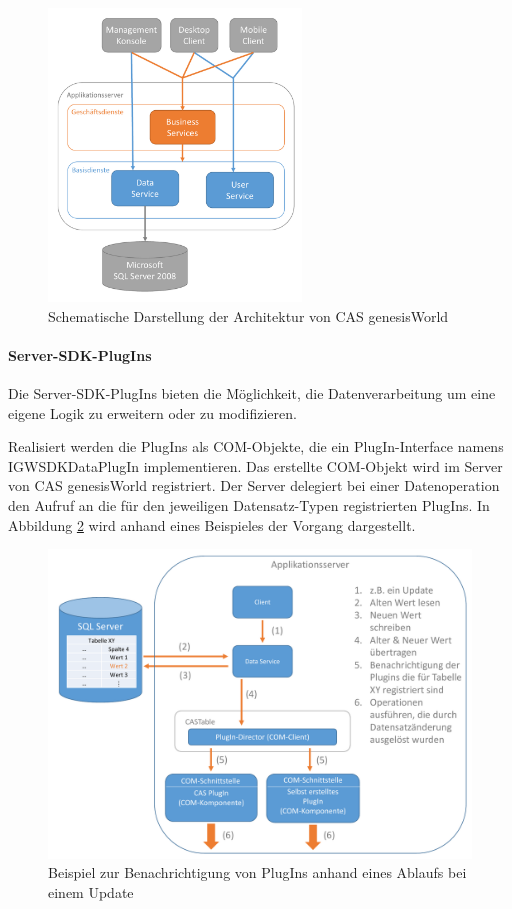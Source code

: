 \begin{figure}[H]
	\centering
  \includegraphics[width=0.6\textwidth, width=0.6\textwidth]{pics/GenesisWorld_Architektur.pdf}
	\caption{Schematische Darstellung der Architektur von CAS genesisWorld}
	\label{gw_Architektur}
\end{figure}

\paragraph{Server-SDK-PlugIns}

Die Server-SDK-PlugIns bieten die Möglichkeit, die Datenverarbeitung um eine eigene Logik zu erweitern oder zu modifizieren. 

Realisiert werden die PlugIns als COM-Objekte, die ein PlugIn-Interface namens IGWSDKDataPlugIn implementieren. Das erstellte COM-Objekt wird im Server von CAS genesisWorld registriert. Der Server delegiert bei einer Datenoperation den Aufruf an die für den jeweiligen Datensatz-Typen registrierten PlugIns. In Abbildung \ref{gw_plugin} wird anhand eines Beispieles der Vorgang dargestellt.

\begin{figure}[H]
	\centering
  \includegraphics[width=1.0\textwidth, width=1.0\textwidth]{pics/analyse_plugins.pdf}
	\caption{Beispiel zur Benachrichtigung von PlugIns anhand eines Ablaufs bei einem Update}
	\label{gw_plugin}
\end{figure}

